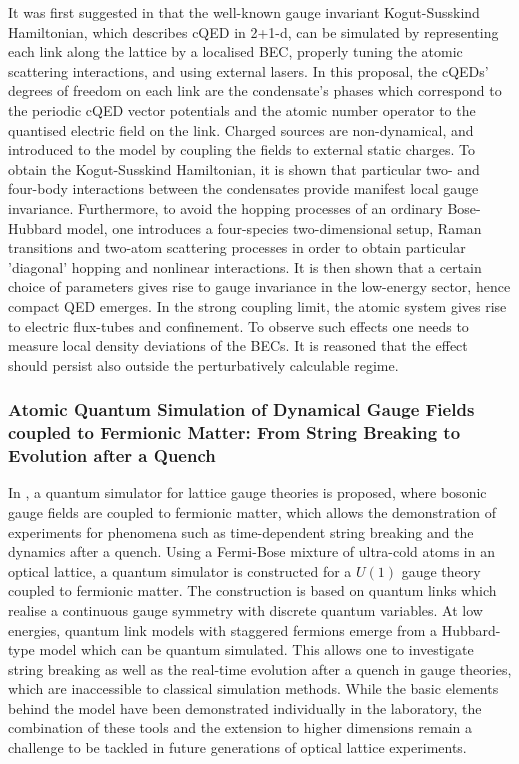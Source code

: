 \documentclass[epj,final]{svjour}
\begin{document}
It was first suggested in \cite{zohar2011confinement} that the well-known gauge invariant Kogut-Susskind Hamiltonian, which describes cQED in 2+1-d, can be simulated by representing each link along the lattice by a localised BEC, properly tuning the atomic scattering interactions, and using external lasers. In this proposal, the cQEDs' degrees of freedom on each link are the condensate's phases which correspond to the periodic cQED vector potentials and the atomic number operator to the quantised electric field on the link. Charged sources are non-dynamical, and introduced to the model by coupling the fields to external static charges. To obtain the Kogut-Susskind Hamiltonian, it is shown that particular two- and four-body interactions between the condensates provide manifest local gauge invariance. Furthermore, to avoid the hopping processes of an ordinary Bose-Hubbard model, one introduces a four-species two-dimensional setup, Raman transitions and two-atom scattering processes in order to obtain particular 'diagonal' hopping and nonlinear interactions. It is then shown that a certain choice of parameters gives rise to gauge invariance in the low-energy sector, hence compact QED emerges. In the strong coupling limit, the atomic system gives rise to electric flux-tubes and confinement. To observe such effects one needs to measure local density deviations of the BECs. It is reasoned that the effect should persist also outside the perturbatively calculable regime.

\subsubsection{Atomic Quantum Simulation of Dynamical Gauge Fields coupled to Fermionic Matter: From String Breaking to Evolution after a Quench\cite{banerjee2012atomic}}

In \cite{banerjee2012atomic}, a quantum simulator for lattice gauge theories is proposed, where bosonic gauge fields are coupled to fermionic matter, which allows the demonstration of experiments for phenomena such as time-dependent string breaking and the dynamics after a quench. Using a Fermi-Bose mixture of ultra-cold atoms in an optical lattice, a quantum simulator is constructed for a $U(1)$ gauge theory coupled to fermionic matter. The construction is based on quantum links which realise a continuous gauge symmetry with discrete quantum variables. At low energies, quantum link models with staggered fermions emerge from a Hubbard-type model which can be quantum simulated. This allows one to investigate string breaking as well as the real-time evolution after a quench in gauge theories, which are inaccessible to classical simulation methods. While the basic elements behind the model have been demonstrated individually in the laboratory, the combination of these tools and the extension to higher dimensions remain a challenge to be tackled in future generations of optical lattice experiments. 
\end{document}
